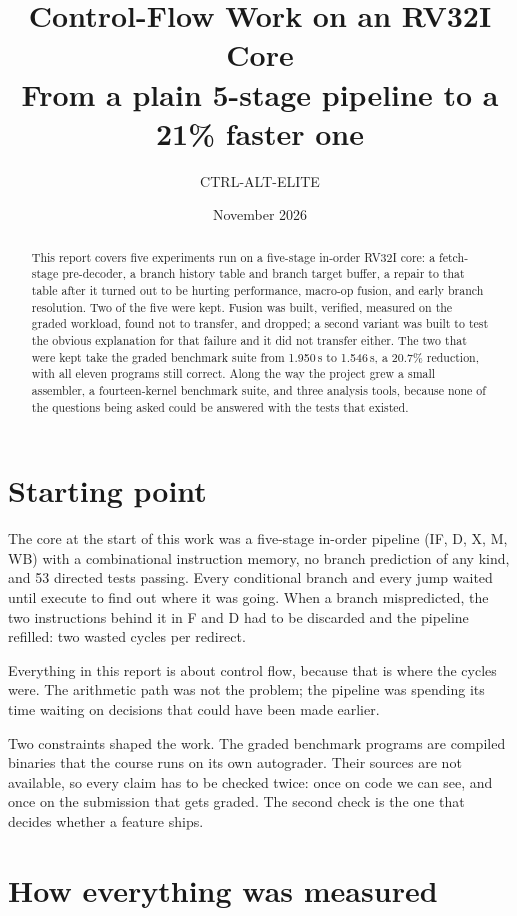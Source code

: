 \documentclass[11pt]{article}
\title{Control-Flow Work on an RV32I Core\\\large From a plain 5-stage pipeline to a 21\% faster one}
\author{CTRL-ALT-ELITE}
\date{November 2026}
\begin{document}
\maketitle

\begin{abstract}
This report covers five experiments run on a five-stage in-order RV32I core: a fetch-stage
pre-decoder, a branch history table and branch target buffer, a repair to that table after it
turned out to be hurting performance, macro-op fusion, and early branch resolution. Two of the
five were kept. Fusion was built, verified, measured on the graded workload, found not to
transfer, and dropped; a second variant was built to test the obvious explanation for that
failure and it did not transfer either. The two that were kept take the graded benchmark suite
from 1.950\,s to 1.546\,s, a 20.7\% reduction, with all eleven programs still correct. Along
the way the project grew a small assembler, a fourteen-kernel benchmark suite, and three
analysis tools, because none of the questions being asked could be answered with the tests that
existed.
\end{abstract}

\section{Starting point}

The core at the start of this work was a five-stage in-order pipeline (IF, D, X, M, WB) with
a combinational instruction memory, no branch prediction of any kind, and 53 directed tests
passing. Every conditional branch and every jump waited until execute to find out where it was
going. When a branch mispredicted, the two instructions behind it in F and D had to be
discarded and the pipeline refilled: two wasted cycles per redirect.

Everything in this report is about control flow, because that is where the cycles were. The
arithmetic path was not the problem; the pipeline was spending its time waiting on decisions
that could have been made earlier.

Two constraints shaped the work. The graded benchmark programs are compiled binaries that the
course runs on its own autograder. Their sources are not available, so every claim has to be
checked twice: once on code we can see, and once on the submission that gets graded. The second
check is the one that decides whether a feature ships.

\section{How everything was measured}
\end{document}
